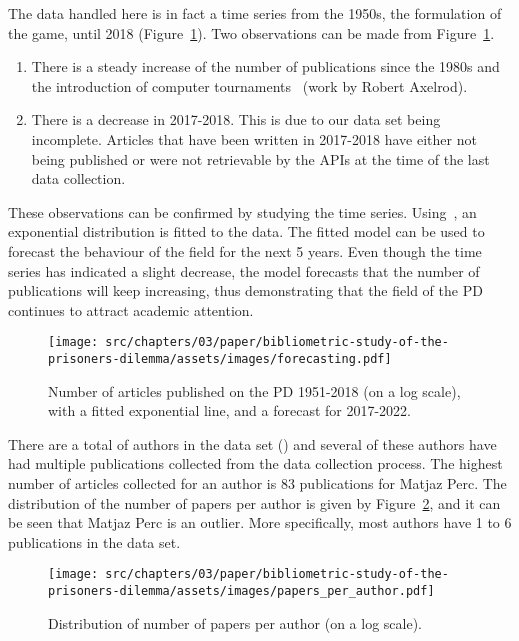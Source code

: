 The data handled  here is in fact a time series from the 1950s, the formulation
of the game, until 2018 (Figure~\ref{fig:timeseries}). Two observations can be
made from Figure~\ref{fig:timeseries}.

\begin{enumerate}
    \item There is a steady increase of the number of publications since the
    1980s and the introduction of computer tournaments~\cite{Axelrod1981}
    (work by Robert Axelrod).
    \item There is a decrease in 2017-2018. This is due to our data set being
    incomplete. Articles that have been written in 2017-2018 have either not
    being published or were not retrievable by the APIs at the time of the last
    data collection.
\end{enumerate}

These observations can be confirmed by studying the time series.
Using~\cite{scipy}, an exponential distribution is fitted to the data.
The fitted model can be used to forecast the
behaviour of the field for the next 5 years. Even
though the time series has indicated a slight decrease, the model forecasts that
the number of publications will keep increasing, thus demonstrating that the
field of the PD continues to attract academic attention.

\begin{figure}[!hbtp]
    \centering
    \texttt{[image: src/chapters/03/paper/bibliometric-study-of-the-prisoners-dilemma/assets/images/forecasting.pdf]}
    \caption{Number of articles published on the PD 1951-2018 (on a log scale),
    with a fitted exponential line, and a forecast for 2017-2022.}\label{fig:timeseries}
\end{figure}

There are a total of \authors authors in the data set (\cite{pd_data_2018}) and several of these
authors have had multiple publications collected from the data collection process.
The highest number of articles collected for an
author is 83 publications for Matjaz Perc. The distribution of the number of
papers per author is given by Figure~\ref{fig:num_papers_per_author}, and it can
be seen that Matjaz Perc is an outlier. More specifically, most authors have
1 to 6 publications in the data set.

\begin{figure}[!hbtp]
    \centering
    \texttt{[image: src/chapters/03/paper/bibliometric-study-of-the-prisoners-dilemma/assets/images/papers\_per\_author.pdf]}
    \caption{Distribution of number of papers per author (on a log scale).}
    \label{fig:num_papers_per_author}
\end{figure}

